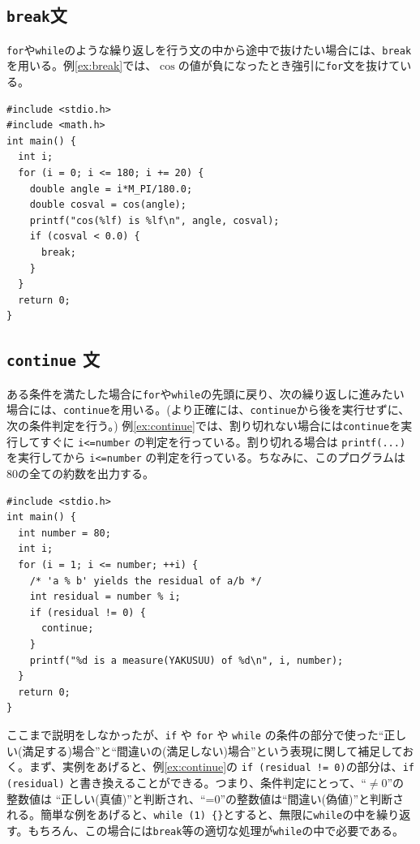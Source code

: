 \subsection{{\tt break}文}
{\tt for}や{\tt while}のような繰り返しを行う文の中から途中で抜けたい場合には、\verb|break|を用いる。例\ref{ex:break}では、$\cos$の値が負になったとき強引に\verb|for|文を抜けている。
\begin{reidai}\label{ex:break}
\begin{verbatim}
#include <stdio.h>
#include <math.h>
int main() {
  int i;
  for (i = 0; i <= 180; i += 20) {
    double angle = i*M_PI/180.0;
    double cosval = cos(angle);
    printf("cos(%lf) is %lf\n", angle, cosval);
    if (cosval < 0.0) {
      break;
    }
  }
  return 0;
}
\end{verbatim}
\end{reidai}

\subsection{{\tt continue} 文}
ある条件を満たした場合に\verb|for|や\verb|while|の先頭に戻り、次の繰り返しに進みたい場合には、\verb|continue|を用いる。(より正確には、\verb|continue|から後を実行せずに、次の条件判定を行う。) 例\ref{ex:continue}では、割り切れない場合には\verb|continue|を実行してすぐに \verb|i<=number| の判定を行っている。割り切れる場合は \verb|printf(...)| を実行してから \verb|i<=number| の判定を行っている。ちなみに、このプログラムは80の全ての約数を出力する。
\begin{reidai}\label{ex:continue}
\begin{verbatim}
#include <stdio.h>
int main() {
  int number = 80;
  int i;
  for (i = 1; i <= number; ++i) {
    /* 'a % b' yields the residual of a/b */
    int residual = number % i;
    if (residual != 0) {
      continue;
    }
    printf("%d is a measure(YAKUSUU) of %d\n", i, number);
  }
  return 0;
}
\end{verbatim}
\end{reidai}

ここまで説明をしなかったが、\verb|if| や \verb|for| や \verb|while| の条件の部分で使った``正しい(満足する)場合''と``間違いの(満足しない)場合''という表現に関して補足しておく。まず、実例をあげると、例\ref{ex:continue}の \verb|if (residual != 0)|の部分は、\verb|if (residual)| と書き換えることができる。つまり、条件判定にとって、``$\neq$0''の整数値は ``正しい(真値)''と判断され、``=0''の整数値は``間違い(偽値)''と判断される。簡単な例をあげると、\verb|while (1) {}|とすると、無限に\verb|while|の中を繰り返す。もちろん、この場合には{\tt break}等の適切な処理が\verb|while|の中で必要である。

